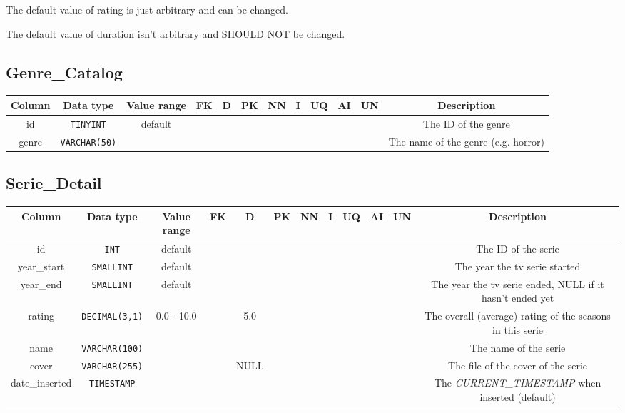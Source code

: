 \documentclass{article}
\newcommand{\dbtable}{\subsection}
\newcommand{\cmark}{\ding{51}}%
\newcommand{\mono}{\texttt}
\begin{document}
	The default value of rating is just arbitrary and can be changed.
	
	The default value of duration isn't arbitrary and SHOULD NOT be changed.
	

	\dbtable{Genre\_Catalog}
	\begin{table}[h!]
		\centering
		\begin{tabular}{|c|c|c|c|c|c|c|c|c|c|c|c|}
			\toprule
			\bfseries Column & \bfseries Data type & \bfseries Value range & \bfseries FK & \bfseries D & \bfseries PK & \bfseries NN & \bfseries I & \bfseries UQ & \bfseries AI & \bfseries UN & \bfseries Description\\
			
			\midrule
			id & \mono{TINYINT} & default & & & \cmark & \cmark & \cmark & \cmark & \cmark & \cmark & The ID of the genre\\
			
			\midrule
			genre & \mono{VARCHAR(50)} & & & & & \cmark & & \cmark & & & The name of the genre (e.g. horror)\\
			
			\bottomrule			
		\end{tabular}
	\end{table}

	\dbtable{Serie\_Detail}
	\begin{table}[h!]
		\centering
		\begin{tabular}{|c|c|c|c|c|c|c|c|c|c|c|c|}
			\toprule
			\bfseries Column & \bfseries Data type & \bfseries Value range & \bfseries FK & \bfseries D & \bfseries PK & \bfseries NN & \bfseries I & \bfseries UQ & \bfseries AI & \bfseries UN & \bfseries Description\\
			
			\midrule
			id & \mono{INT} & default & & & \cmark & \cmark & \cmark & \cmark & & \cmark & The ID of the serie\\
			
			\midrule
			year\_start & \mono{SMALLINT} & default & & & & \cmark & & & & \cmark & The year the tv serie started\\
			
			\midrule
			year\_end & \mono{SMALLINT} & default & & & & & & & & \cmark & The year the tv serie ended, NULL if it hasn't ended yet\\
			
			\midrule
			rating & \mono{DECIMAL(3,1)} & 0.0 - 10.0 & & 5.0 & & \cmark & & & & & The overall (average) rating of the seasons in this serie\\
			
			\midrule
			name & \mono{VARCHAR(100)} & & & & & \cmark & & & & & The name of the serie\\
			
			\midrule
			cover & \mono{VARCHAR(255)} & & & NULL & & & & & & & The file of the cover of the serie\\
			
			\midrule			
			date\_inserted & \mono{TIMESTAMP} & & & & & \cmark & & & & & The \textit{CURRENT\_TIMESTAMP} when inserted (default)\\
			
			\bottomrule
		\end{tabular}
	\end{table}
\end{document}
